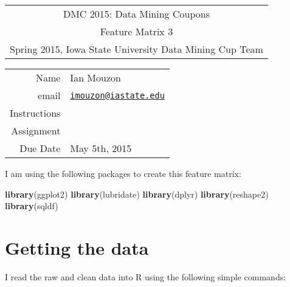 \documentclass[10pt]{report}
\newenvironment{Shaded}{}{}
\newcommand{\KeywordTok}[1]{\textcolor[rgb]{0.00,0.44,0.13}{\textbf{{#1}}}}
\newcommand{\NormalTok}[1]{{#1}}
\begin{document}
\thispagestyle{empty}%
\begin{center}%
    \renewcommand{\arraystretch}{1.5}%
    \begin{tabular}{c}%
       \Large{DMC 2015: Data Mining Coupons}\\
       Feature Matrix 3\\
       Spring 2015, Iowa State University Data Mining Cup Team\\
    \end{tabular}
\end{center}

\begin{center}
 \renewcommand{\arraystretch}{1.5}
 \begin{tabular*}{0.65\textwidth}{r@{:\hspace{.3cm}}l}
    \hline
    Name& Ian Mouzon\\
    email& \href{mailto:imouzon@iastate.edu}{\nolinkurl{imouzon@iastate.edu}}\\
    Instructions& \\
    Assignment& \\
    Due Date&  May 5th, 2015\\
    \hline
 \end{tabular*}
\end{center}

I am using the following packages to create this feature matrix:

\begin{Shaded}
\begin{Highlighting}[]
\KeywordTok{library}\NormalTok{(ggplot2)}
\KeywordTok{library}\NormalTok{(lubridate)}
\KeywordTok{library}\NormalTok{(dplyr)}
\KeywordTok{library}\NormalTok{(reshape2)}
\KeywordTok{library}\NormalTok{(sqldf)}
\end{Highlighting}
\end{Shaded}

\section{Getting the data}\label{getting-the-data}

I read the raw and clean data into R using the following simple
commands:
\end{document}
